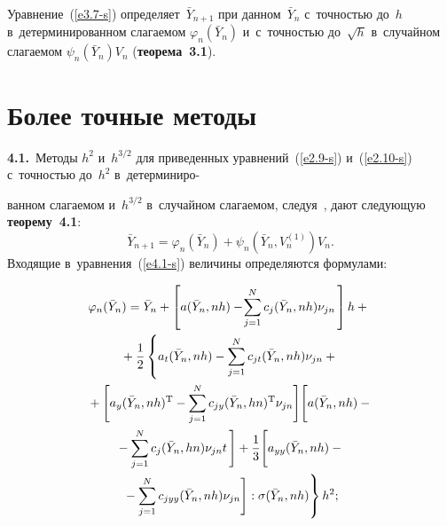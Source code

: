 \begin{multicols}{2}
\vspace*{-2pt}


Уравнение~(\ref{e3.7-s}) определяет~$\bar Y_{n+1}$ при данном~$\bar Y_n$ с~точ\-ностью до~$h$ в~детерминированном слагаемом $\varphi_n(\bar Y_n)$ и~с~точ\-ностью до~$\sqrt{h}$ в~случайном слагаемом $\psi_n(\bar Y_n)V_n$ (\textbf{тео\-ре\-ма~3.1}).

\vspace*{-6pt}

\section{Более точные методы}

\vspace*{-3pt}

\textbf{4.1.}\ Методы $h^2$ и~$h^{3/2}$ для приведенных уравнений~(\ref{e2.9-s}) и~(\ref{e2.10-s}) 
с~точ\-ностью до~$h^2$ в~детерминиро-\linebreak\vspace*{-12pt}

\pagebreak

\noindent
ванном слагаемом и~$h^{3/2}$ в~случайном 
слагаемом, следуя~\cite{11-s, 12-s}, дают следующую \textbf{тео\-ре\-му~4.1}:
\begin{equation}
\bar Y_{n+1}=\varphi_n(\bar Y_n)+\psi_n(\bar     Y_n,V_n^{(1)})V_n.
\label{e4.1-s}
\end{equation}
Входящие в~уравнения~(\ref{e4.1-s}) величины определяются формулами:

\vspace*{-6pt}

\noindent
 \begin{multline*}
 \!\varphi_n(\bar Y_n)=\bar Y_n+\left[a(\bar Y_n,nh)-\!\sum_{j=1}^N
    c_j(\bar Y_n,nh)\nu_{jn}\, \right]h+{}\\
{}+\displaystyle\frac{\displaystyle 1\mathstrut}{\displaystyle 2\mathstrut}\left\{a_t(\bar Y_n,nh)-\sum\limits_{j=1}^N c_{jt}(\bar 
Y_n,nh)\nu_{jn}+   {}\right.\\
{}+ \Biggl[ a_y(\bar Y_n,nh)^{\mathrm{T}}-\sum\limits_{j=1}^N c_{jy}(\bar Y_n,hn)^{\mathrm{T}} \nu_{jn} \Biggr]
    \Biggl[ a(\bar Y_n,nh)-{}\\
    {}- \sum\limits_{j=1}^N c_j(\bar Y_n,hn) \nu_{jn}t\,\Biggr]+
    \displaystyle\frac{\displaystyle 1\mathstrut}{\displaystyle 3\mathstrut}\Biggl[ a_{yy}(\bar Y_n,nh)-{}\\
   \left. {}-\sum\limits_{j=1}^N
    c_{jyy}(\bar Y_n,nh)\nu_{jn} \Biggr]: \sigma(\bar Y_n,nh)\right\}h^2;
\end{multline*}

\vspace*{-12pt}


\end{multicols}
